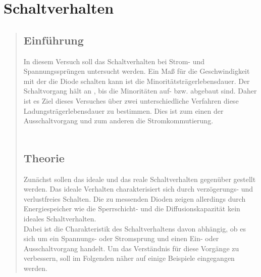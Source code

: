 \section{Schaltverhalten}
\begin{quote}


    \subsection{Einführung}

    In diesem Versuch soll das Schaltverhalten bei Strom- und Spannungssprüngen
    untersucht werden. Ein Maß für die Geschwindigkeit mit der die Diode schalten
    kann ist die Minoritätsträgerlebensdauer. Der Schaltvorgang hält an
    , bis die Minoritäten auf- bzw. abgebaut sind. Daher ist es Ziel dieses
    Versuches über zwei unterschiedliche Verfahren diese Ladungsträgerlebensdauer
    zu bestimmen. Dies ist zum einen der Ausschaltvorgang und zum anderen
    die Stromkommutierung.\\
    \\

    \subsection{Theorie}

    Zunächst sollen das ideale und das reale Schaltverhalten gegenüber gestellt
    werden. Das ideale Verhalten charakterisiert sich durch verzögerungs- und
    verlustfreies Schalten. Die zu messenden Dioden zeigen allerdings durch
    Energiespeicher wie die Sperrschicht- und die Diffusionskapazität kein
    ideales Schaltverhalten. \\

    Dabei ist die Charakteristik des Schaltverhaltens davon abhängig, ob es
    sich um ein Spannungs- oder Stromsprung und einen Ein- oder Ausschaltvorgang
    handelt. Um das Verständnis für diese Vorgänge zu verbessern, soll im
    Folgenden näher auf einige Beispiele eingegangen werden.\\


\end{quote}
